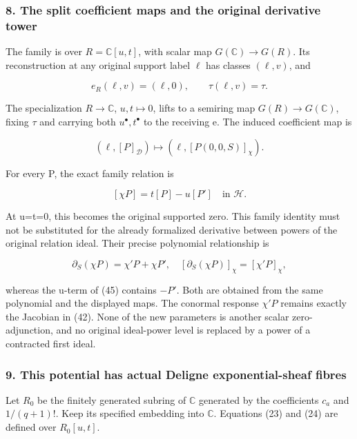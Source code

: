 \subsubsection{8. The split coefficient maps and the original derivative tower}\label{endpoint-exponential_original--the-split-coefficient-maps-and-the-original-derivative-tower}

The family is over \(R=\mathbb C[u,t]\), with scalar map \(G(\mathbb C)\to G(R)\). Its reconstruction at any original support label \(\ell\) has classes \((\ell,v)\), and

\[
e_R(\ell,v)=(\ell,0),\qquad \tau(\ell,v)=\tau.
\tag{43}
\]

The specialization \(R\to\mathbb C\), \(u,t\mapsto0\), lifts to a semiring map \(G(R)\to G(\mathbb C)\), fixing \(\tau\) and carrying both \(u^\bullet,t^\bullet\) to the receiving e. The induced coefficient map is

\[
(\ell,[P]_{\mathcal D})\longmapsto
(\ell,[P(0,0,S)]_\chi).
\tag{44}
\]

For every P, the exact family relation is

\[
[\chi P]=t[P]-u[P']\quad\text{in }\mathcal H.
\tag{45}
\]

At u=t=0, this becomes the original supported zero. This family identity must not be substituted for the already formalized derivative between powers of the original relation ideal. Their precise polynomial relationship is

\[
\partial_S(\chi P)=\chi'P+\chi P',\quad
[\partial_S(\chi P)]_\chi=[\chi'P]_\chi,
\tag{46}
\]

whereas the u-term of (45) contains \(-P'\). Both are obtained from the same polynomial and the displayed maps. The conormal response \(\chi'P\) remains exactly the Jacobian in (42). None of the new parameters is another scalar zero-adjunction, and no original ideal-power level is replaced by a power of a contracted first ideal.

\subsubsection{9. This potential has actual Deligne exponential-sheaf fibres}\label{endpoint-exponential_original--this-potential-has-actual-deligne-exponential-sheaf-fibres}

Let \(R_0\) be the finitely generated subring of \(\mathbb C\) generated by the coefficients \(c_a\) and \(1/(q+1)!\). Keep its specified embedding into \(\mathbb C\). Equations (23) and (24) are defined over \(R_0[u,t]\).


